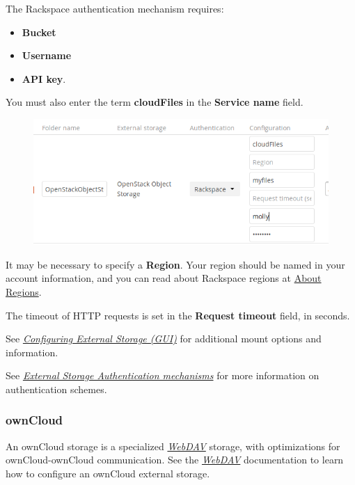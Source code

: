 \documentclass[letterpaper,10pt,english]{sphinxmanual}
\begin{document}
The Rackspace authentication mechanism requires:
\begin{itemize}
\item {} 
\textbf{Bucket}

\item {} 
\textbf{Username}

\item {} 
\textbf{API key}.

\end{itemize}

You must also enter the term \textbf{cloudFiles} in the \textbf{Service name} field.
\begin{figure}[htbp]
\centering

\includegraphics{rackspace.png}
\end{figure}

It may be necessary to specify a \textbf{Region}. Your region should be named in
your account information, and you can read about Rackspace regions at
\href{https://support.rackspace.com/how-to/about-regions/}{About Regions}.

The timeout of HTTP requests is set in the \textbf{Request timeout} field, in
seconds.

See {\hyperref[configuration_files/external_storage_configuration_gui::doc]{\emph{Configuring External Storage (GUI)}}} for additional mount
options and information.

See {\hyperref[configuration_files/external_storage/auth_mechanisms::doc]{\emph{External Storage Authentication mechanisms}}} for more information on authentication schemes.


\subsubsection{ownCloud}
\label{configuration_files/external_storage/owncloud:owncloud}\label{configuration_files/external_storage/owncloud::doc}
An ownCloud storage is a specialized {\hyperref[configuration_files/external_storage/webdav::doc]{\emph{WebDAV}}} storage, with optimizations
for ownCloud-ownCloud communication. See the {\hyperref[configuration_files/external_storage/webdav::doc]{\emph{WebDAV}}} documentation to
learn how to configure an ownCloud external storage.
\end{document}
